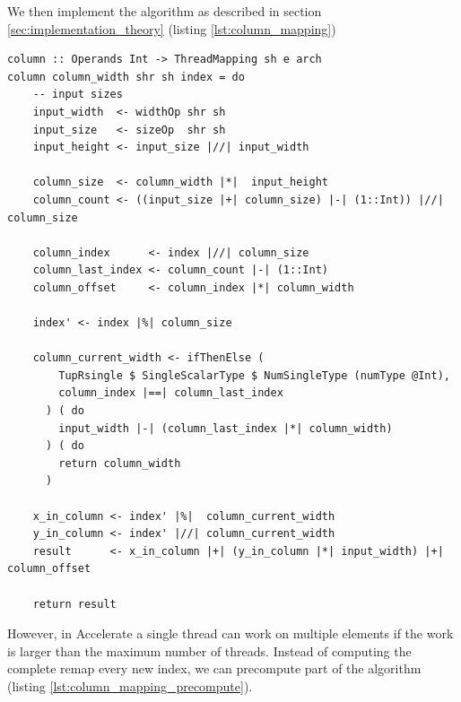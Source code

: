We then implement the algorithm as described in section \ref{sec:implementation_theory} (listing \ref{lst:column_mapping})
\begin{listing}
    \begin{verbatim}
column :: Operands Int -> ThreadMapping sh e arch
column column_width shr sh index = do
    -- input sizes
    input_width  <- widthOp shr sh
    input_size   <- sizeOp  shr sh
    input_height <- input_size |//| input_width
    
    column_size  <- column_width |*|  input_height
    column_count <- ((input_size |+| column_size) |-| (1::Int)) |//| column_size

    column_index      <- index |//| column_size
    column_last_index <- column_count |-| (1::Int)
    column_offset     <- column_index |*| column_width

    index' <- index |%| column_size

    column_current_width <- ifThenElse (
        TupRsingle $ SingleScalarType $ NumSingleType (numType @Int), 
        column_index |==| column_last_index
      ) ( do
        input_width |-| (column_last_index |*| column_width)
      ) ( do
        return column_width
      )
    
    x_in_column <- index' |%|  column_current_width
    y_in_column <- index' |//| column_current_width
    result      <- x_in_column |+| (y_in_column |*| input_width) |+| column_offset

    return result
    \end{verbatim}
    \caption{
    }
    \label{lst:column_mapping}
\end{listing}
However, in Accelerate a single thread can work on multiple elements if the work is larger than the maximum number of threads.
Instead of computing the complete remap every new index, we can precompute part of the algorithm (listing \ref{lst:column_mapping_precompute}).

